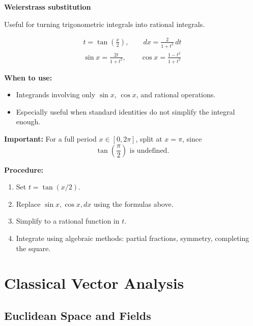 \documentclass[11pt]{report}
\theoremstyle{definition}
\theoremstyle{plain}
\theoremstyle{remark}
\begin{document}
\begin{center}
\begin{minipage}{0.48\textwidth}
\end{minipage}
\hfill
\begin{minipage}{0.48\textwidth}
\textbf{Weierstrass substitution}

\begin{tcolorbox}[colframe=black, colback=white]
Useful for turning trigonometric integrals into rational integrals.

\begin{gather*}
t=\tan\left(\frac{x}{2}\right),\qquad
dx=\frac{2}{1+t^2}\,dt \\
\sin x=\frac{2t}{1+t^2},\qquad
\cos x=\frac{1-t^2}{1+t^2}
\end{gather*}

\textbf{When to use:}
\begin{itemize}[leftmargin=1.5em]
    \item Integrands involving only \(\sin x\), \(\cos x\), and rational operations.
    \item Especially useful when standard identities do not simplify the integral enough.
\end{itemize}

\textbf{Important:}
For a full period \(x\in[0,2\pi]\), split at \(x=\pi\), since
\[
\tan\left(\frac{\pi}{2}\right) \text{ is undefined.}
\]

\textbf{Procedure:}
\begin{enumerate}[leftmargin=1.5em]
    \item Set \(t=\tan(x/2)\).
    \item Replace \(\sin x,\cos x,dx\) using the formulas above.
    \item Simplify to a rational function in \(t\).
    \item Integrate using algebraic methods: partial fractions, symmetry, completing the square.
\end{enumerate}
\end{tcolorbox}

\end{minipage}

\end{center}

\part{Classical Vector Analysis}

\chapter{Euclidean Space and Fields}
\end{document}
